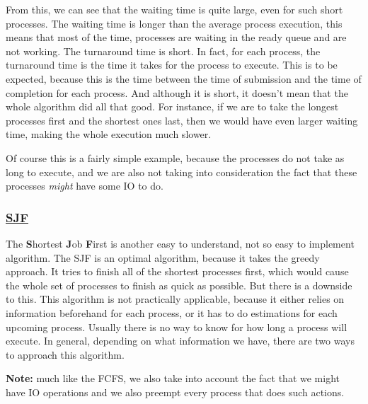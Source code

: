 \documentclass{article}
\begin{document}
From this, we can see that the waiting time is quite large, even for such short processes. The waiting time is longer than the average process execution, this means that most of the time, processes are waiting in the ready queue and are not working. The turnaround time is short. In fact, for each process, the turnaround time is the time it takes for the process to execute. This is to be expected, because this is the time between the time of submission and the time of completion for each process. And although it is short, it doesn't mean that the whole algorithm did all that good. For instance, if we are to take the longest processes first and the shortest ones last, then we would have even larger waiting time, making the whole execution much slower.

Of course this is a fairly simple example, because the processes do not take as long to execute, and we are also not taking into consideration the fact that these processes \textit{might} have some IO to do.

\subsubsection{\underline{SJF}}

The \textbf{S}hortest \textbf{J}ob \textbf{F}irst is another easy to understand, not so easy to implement algorithm. The SJF is an optimal algorithm, because it takes the greedy approach. It tries to finish all of the shortest processes first, which would cause the whole set of processes to finish as quick as possible. But there is a downside to this. This algorithm is not practically applicable, because it either relies on information beforehand for each process, or it has to do estimations for each upcoming process. Usually there is no way to know for how long a process will execute. In general, depending on what information we have, there are two ways to approach this algorithm.

\textbf{Note:} much like the FCFS, we also take into account the fact that we might have IO operations and we also preempt every process that does such actions.
\end{document}
